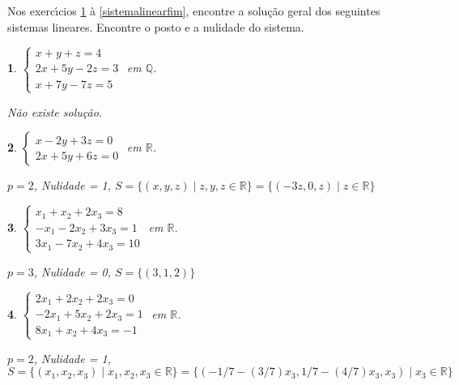 \documentclass[12pt]{exam}
\newtheorem{exercicio}{}
\newcommand{\rac}{\mathbb{Q}}
\newcommand{\real}{\mathbb{R}}
\begin{document}
Nos exerc{\'\i}cios \ref{sistemalinearinicio} \`a \ref{sistemalinearfim}, encontre a solu\c{c}\~ao geral dos seguintes sistemas lineares. Encontre o posto e a nulidade do sistema.
\begin{exercicio}\label{sistemalinearinicio}
$\begin{cases}
  x + y + z = 4\\
  2x + 5y - 2z = 3\\
  x + 7y - 7z = 5
\end{cases}$ em $\rac$.
\begin{solucao}
  N\~ao existe solu\c{c}\~ao.
\end{solucao}
\end{exercicio}

\begin{exercicio}
$\begin{cases}
  x - 2y + 3z = 0\\
  2x + 5y + 6z = 0
\end{cases}$ em $\real$.
\begin{solucao}
  $p = 2$, Nulidade = 1, $S = \{(x, y, z) \mid z, y, z \in \real\} = \{(-3z, 0, z) \mid z \in \real\}$
\end{solucao}
\end{exercicio}


\begin{exercicio}
$\begin{cases}
  x_1 + x_2 + 2x_3 = 8\\
  -x_1 - 2x_2 + 3x_3 = 1\\
  3x_1 - 7x_2 + 4x_3 = 10
\end{cases}$ em $\real$.
\begin{solucao}
  $p = 3$, Nulidade = 0, $S = \{(3, 1, 2)\}$
\end{solucao}
\end{exercicio}

\begin{exercicio}
$\begin{cases}
  2x_1 + 2x_2 + 2x_3 = 0\\
  -2x_1 + 5x_2 + 2x_3 = 1\\
  8x_1 + x_2 + 4x_3 = -1
\end{cases}$ em $\real$.
\begin{solucao}
  $p = 2$, Nulidade = 1, $S = \{(x_1, x_2, x_3) \mid x_1, x_2, x_3 \in \real\} = \{(-1/7 - (3/7)x_3, 1/7 - (4/7)x_3, x_3) \mid x_3 \in \real\}$
\end{solucao}
\end{exercicio}
\end{document}
